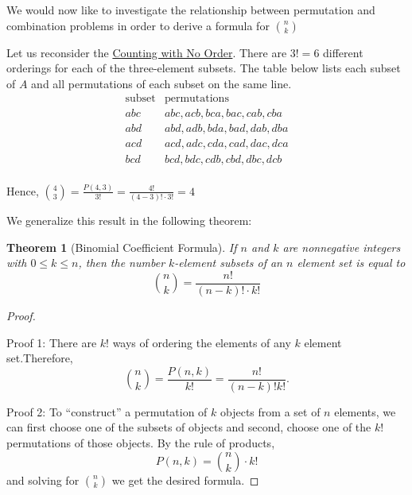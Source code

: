 \documentclass[10pt,]{book}
\theoremstyle{plain}
\newtheorem{theorem}{Theorem}[section]
\theoremstyle{definition}
\theoremstyle{definition}
\theoremstyle{definition}
\begin{document}
\par
We would now like to investigate the relationship between permutation and combination problems in order to derive a formula for \(\binom{n}{k}\)%
\par
Let us reconsider the \hyperref[four-choose-three]{Counting with No Order}. There are \(3 ! = 6\) different orderings for each of the three-element subsets. The table below lists each subset of \(A\)  and all permutations of each subset on the same line.
\begin{equation*}
 \begin{array}{cc}
 \textrm{subset} & \textrm{permutations} \\
 abc & abc,acb,bca,bac,cab,cba \\
 abd & abd,adb,bda,bad,dab,dba \\
 acd & acd,adc,cda,cad,dac,dca \\
 bcd & bcd,bdc,cdb,cbd,dbc,dcb \\
\end{array}
 \end{equation*}%
\par
 Hence, \(\binom{4}{3} = \frac{P(4,3)}{3!} = \frac{4!}{(4-3)! \cdot 3!} = 4\)%
\par
 We generalize this result in the following theorem:%
\begin{theorem}[Binomial Coefficient Formula]\label{binomial-coefficient-formula}
If \(n\) and \(k\) are nonnegative integers with \(0 \leq k \leq n\), then the number \(k\)-element subsets of an \(n\) element set is equal to \begin{equation*}\binom{n}{k} = \frac{n!}{(n-k)! \cdot k!} \end{equation*}%
\end{theorem}
\begin{proof}\hypertarget{proof-3}{}
Proof 1: There are \(k!\) ways of ordering the elements of any \(k\) element set.Therefore,
\begin{equation*}\binom{n}{k} = \frac{P(n,k)}{k!} = \frac{n!}{(n-k)! k!}.\end{equation*}%
\par
Proof 2: To ``construct'' a permutation of \(k\)  objects from a set of \(n\) elements, we can first choose one of the subsets of objects and second, choose one of the \(k!\)  permutations of those objects. By the rule of products,\begin{equation*}P(n,k) = \binom{n}{k} \cdot k!\end{equation*} and solving for \(\binom{n}{k}\) we get the desired formula.%
\end{proof}
\end{document}
